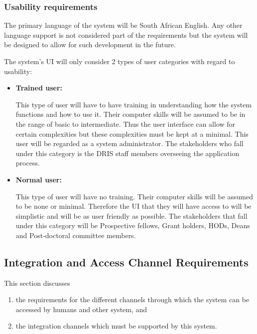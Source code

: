 \documentclass[12pt]{article}
\begin{document}
\subsubsection{Usability requirements}

\begin{flushleft}

The primary language of the system will be South African English. Any other language support is not considered part of the requirements but the system will be designed to allow for such development in the future.\\

\vspace{0.1in}

The system's UI will only consider 2 types of user categories with regard to usability:

\begin{itemize}

\item\textbf{Trained user:}

This type of user will have to have training in understanding how the system functions and how to use it. Their computer skills will be assumed to be in the range of basic to intermediate. Thus the user interface can allow for certain complexities but these complexities must be kept at a minimal. This user will be regarded as a system administrator. The stakeholders who fall under this category is the DRIS staff members overseeing the application process.

\item\textbf{Normal user:}

This type of user will have no training. Their computer skills will be assumed to be none or minimal. Therefore the UI that they will have access to will be simplistic and will be as user friendly as possible. The stakeholders that fall under this category will be Prospective fellows, Grant holders, HODs, Deans and Post-doctoral committee members.

\end{itemize}

\end{flushleft}

\vspace{0.2in}	

\subsection{Integration and Access Channel Requirements}
This section discusses 
\begin{enumerate}
\item the requirements for the different channels through which the system can be accessed by humans and other system, and
\item the integration channels which must be supported by this system.
\end{enumerate}
\end{document}
